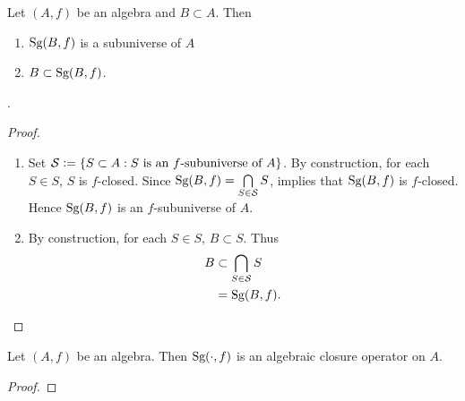 \documentclass{book}
\begin{document}
	\begin{ex}
		Let $(A, f)$ be an algebra and $B \subset A$. Then 
		\begin{enumerate}
			\item $\operatorname*{\text{Sg}}(B, f)$ is a subuniverse of $A$
			\item $B \subset \operatorname*{\text{Sg}}(B, f)$.
		\end{enumerate}.
	\end{ex}

	\begin{proof}\
		\begin{enumerate}
			\item Set $\mathcal{S} \vcentcolon= \{S \subset A: \text{$S$ is an $f$-subuniverse of $A$}\}$. By construction, for each $S \in S$, $S$ is $f$-closed. Since $\operatorname*{\text{Sg}}(B, f) = \bigcap\limits_{S \in \mathcal{S}} S$, \rex{}  implies that $\operatorname*{\text{Sg}}(B, f)$ is $f$-closed. Hence $\operatorname*{\text{Sg}}(B, f)$ is an $f$-subuniverse of $A$. 
			\item By construction, for each $S \in S$, $B \subset S$. Thus
			\begin{align*}
				B
				& \subset \bigcap\limits_{S \in \mathcal{S}} S \\
				& = \operatorname*{\text{Sg}}(B, f).
			\end{align*}
		\end{enumerate}
	\end{proof}

	\begin{ex}
		Let $(A, f)$ be an algebra. Then $\operatorname*{\text{Sg}}(\cdot, f)$ is an algebraic closure operator on $A$.
	\end{ex}

	\begin{proof}
		
	\end{proof}

	

	

	



	
	
	
	
	
	
	
	
	
	
	
	
	
	
	
	
	
	
	
	
	
	
	
	
	
	
\end{document}
